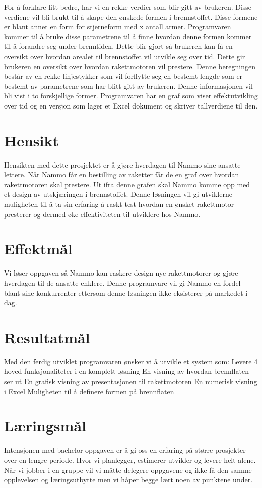 For å forklare litt bedre, har vi en rekke verdier som blir gitt av brukeren. Disse verdiene vil bli brukt til å skape den ønskede formen i brennstoffet. Disse formene er blant annet en form for stjerneform med  x antall armer. Programvaren kommer til å bruke disse parametrene til å finne hvordan denne formen kommer til å forandre seg under brenntiden. Dette blir gjort så brukeren kan få en oversikt over hvordan arealet til brennstoffet vil utvikle seg over tid. Dette gir brukeren en oversikt over hvordan rakettmotoren vil prestere. Denne beregningen består av en rekke linjestykker som vil forflytte seg en bestemt lengde som er bestemt av parametrene som har blitt gitt av brukeren. Denne informasjonen vil bli vist i to forskjellige former. Programvaren har en graf som viser effektutvikling over tid og en versjon som lager et Excel dokument og skriver tallverdiene til den.

\section{Hensikt}
Hensikten med dette prosjektet er å gjøre hverdagen til Nammo sine ansatte lettere. Når Nammo får en bestilling av raketter får de en graf over hvordan rakettmotoren skal prestere. Ut ifra denne grafen skal Nammo komme opp med et design av utskjæringen i brennstoffet. Denne løsningen vil gi utviklerne muligheten til å ta sin erfaring å raskt test hvordan en ønsket rakettmotor presterer og dermed øke effektiviteten til utviklere hos Nammo.

\section{Effektmål}
Vi løser oppgaven så Nammo kan raskere design nye rakettmotorer og gjøre hverdagen til de ansatte enklere. Denne programvare vil gi Nammo en fordel blant sine konkurrenter ettersom denne løsningen ikke eksisterer på markedet i dag.

\section{Resultatmål}
Med den ferdig utviklet programvaren ønsker vi å utvikle et system som:
Levere 4 hoved funksjonaliteter i en komplett løsning
	En visning av hvordan brennflaten ser ut
	En grafisk visning av presentasjonen til rakettmotoren
En numerisk visning i Excel
Muligheten til å definere formen på brennflaten

\section{Læringsmål}
Intensjonen med bachelor oppgaven er å gi oss en erfaring på større prosjekter over en lengre periode. Hvor vi planlegger, estimerer utvikler og levere helt alene. Når vi jobber i en gruppe vil vi måtte delegere oppgavene og ikke få den samme opplevelsen og læringsutbytte men vi håper begge lært noen av punktene under.

